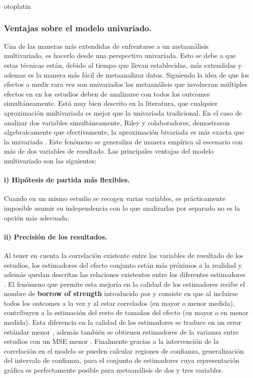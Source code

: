 otoplatin\documentclass[a4paper,openright,12pt]{report}
\begin{document}
\subsubsection{Ventajas sobre el modelo univariado.}
Una de las maneras más extendidas de enfrentarse a un metaanálisis multivariado, es hacerlo desde una perspectiva univariada. Esto se debe a que estas técnicas están, debido al tiempo que llevan establecidas, más extendidas y ademas es la manera más fácil de metaanalizar datos.
Siguiendo la idea de que los efectos a medir rara vez son univariados \cite{Eysenck1994} los metaanálisis que involucran múltiples efectos en en los estudios deben de analizarse con todos los outcomes simultáneamente. Está muy bien descrito en la literatura, que cualquier aproximación multivariada es mejor que la univariada tradicional. En el caso de analizar dos variables simultáneamente, Riley y colaboradores, demostraron algebraicamente que efectivamente, la aproximación bivariada es más exacta que la univariada \cite{Riley2007}. Este fenómeno se generaliza de manera empírica al escenario con más de dos variables de resultado.
Las principales ventajas del modelo multivariado son las siguientes:
\paragraph{i) Hipótesis de partida más flexibles.} Cuando en un mismo estudio se recogen varias variables, es prácticamente imposible asumir su independencia \cite{Nam2003}\cite{Jackson2011}\cite{Riley2007} con lo que analizarlas por separado no es la opción más adecuada.
\paragraph{ii) Precisión de los resultados.} Al tener en cuenta la correlación existente entre las variables de resultado de los estudios, los estimadores del efecto conjunto están más próximos a la realidad y además quedan descritas las relaciones existentes entre los diferentes estimadores \cite{Jackson2011}. El fenómeno que permite esta mejoría en la calidad de los estimadores recibe el nombre de \textbf{borrow of strength} introducido por \cite{Higgins1996} y consiste en que al incluirse todos los outcomes a la vez y al estar correlados (en mayor o menor medida), contribuyen a la estimación del resto de tamaños del efecto (en mayor o en menor medida)\cite{Nam2003}\cite{Mavridis2011}. Esta diferencia en la calidad de los estimadores se traduce en un error estándar menor \cite{Riley2007}\cite{Jackson2011}, además también se obtienen estimadores de la varianza entre estudios con un MSE menor \cite{Jackson2011}. Finalmente gracias a la intervención de la correlación en el modelo se pueden calcular regiones de confianza, generalización del intervalo de confianza, para el conjunto de estimadores \cite{Jackson2011} cuya representación gráfica es perfectamente posible para metaanálisis de dos y tres variables.
\end{document}
